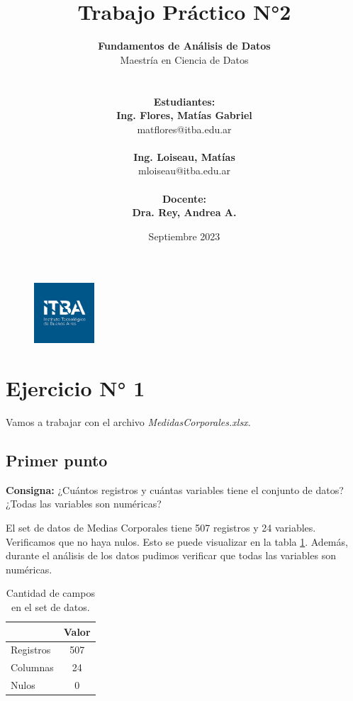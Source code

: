\documentclass{article} %
\title{Trabajo Práctico N°2} %
\date{Septiembre 2023} %
\author{
	\textbf{Fundamentos de Análisis de Datos}\\
	Maestría en Ciencia de Datos\\
	\\~\\
	\textbf{Estudiantes: }\\
	\textbf{Ing. Flores, Matías Gabriel}\\
	matflores@itba.edu.ar
 	\\~\\
 	\textbf{Ing. Loiseau, Matías}\\
 	mloiseau@itba.edu.ar
 	\\~\\
	\textbf{Docente: }\\
	\textbf{Dra. Rey, Andrea A.}
}
\begin{document}

\begin{figure}
\centering
	\includegraphics[width=0.2\textwidth]{images/itba-logo}
	\label{fig:itba-logo}
\end{figure}
\maketitle %

\thispagestyle{empty} %
\cleardoublepage

\cleardoublepage
\tableofcontents %
\cleardoublepage


\section{Ejercicio N° 1}

Vamos a trabajar con el archivo \textit{MedidasCorporales.xlsx}.

\subsection{Primer punto}

\textbf{Consigna:} ¿Cuántos registros y cuántas variables tiene el conjunto de datos? ¿Todas las variables
son numéricas?

El set de datos de Medias Corporales tiene 507 registros y 24 variables. Verificamos que no haya nulos. Esto se puede visualizar en la tabla \ref{tab:table-punto-1-1}. Además, durante el análisis de los datos pudimos verificar que todas las variables son numéricas.

\begin{table}[H]
	\centering
		\begin{tabular}{||l | c ||}
			\hline
			\hline
			 & Valor\\
			\hline			
			\hline
			Registros & 507\\
			\hline
			Columnas & 24\\
			\hline
			Nulos & 0 \\
			\hline
			\hline
		\end{tabular}
		\caption{Cantidad de campos en el set de datos.}
	\label{tab:table-punto-1-1}
\end{table}
\end{document}
